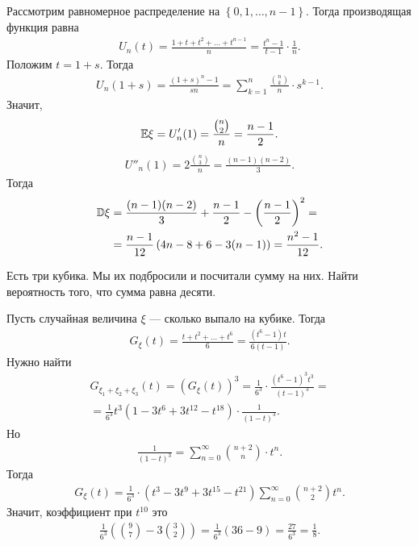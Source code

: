\documentclass[../main.tex]{subfiles}
\begin{document}
\begin{exmpl}
 Рассмотрим равномерное распределение на $  \left\{ 0,1,\ldots,n-1 \right\} $. Тогда производящая функция равна
 \begin{align*}
  U_n(t) = \frac{1 + t + t^{2} + \ldots + t^{n-1}}{n} = \frac{t^{n}-1}{t-1} \cdot \frac{1}{n}.
 \end{align*} Положим $ t = 1 + s $. Тогда
 \begin{align*}
  U_n(1 + s) = \frac{(1+s)^{n} - 1}{sn} = \sum_{k=1}^{n} \frac{\binom n k}{n} \cdot s^{k-1}.
 \end{align*} Значит,
 \begin{align*}
  \mathbb E \xi = U'_n(1) = \frac{\binom n 2}{n} = \frac{n-1}{2}.
 \end{align*}
 \begin{align*}
  U''_n(1) = 2 \frac{\binom n 3}{n} = \frac{(n-1)(n-2)}{3}.
 \end{align*} Тогда
 \begin{align*}
  \mathbb D \xi &= \frac{(n-1)(n-2)}{3} + \frac{n-1}{2} - \left( \frac{n-1}{2} \right)^{2} = \\
  &= \frac{n - 1}{12} \left( 4n - 8 + 6 - 3(n - 1) \right) = \frac{n^{2}-1}{12}.
 \end{align*}
\end{exmpl}

\begin{exmpl}
 Есть три кубика. Мы их подбросили и посчитали сумму на них. Найти вероятность того, что сумма равна десяти.

 Пусть случайная величина $ \xi $ --- сколько выпало на кубике. Тогда
 \begin{align*}
  G_\xi(t) = \frac{t + t^{2} + \ldots + t^{6}}{6} = \frac{(t^{6}-1)t}{6(t-1)}.
 \end{align*} Нужно найти
 \begin{align*}
  G_{\xi_1 + \xi_2 + \xi_3}(t) = (G_\xi(t))^{3} = \frac{1}{6^{3}} \cdot \frac{(t^{6}-1)^{3}t^{3}}{(t-1)^{3}} = \\
  = \frac{1}{6^{3}} t^{3}(1 - 3t^{6} + 3t^{12} - t^{18}) \cdot \frac{1}{(1-t)^{3}}.
 \end{align*} Но
 \begin{align*}
  \frac{1}{(1-t)^{3}} = \sum_{n=0}^{\infty} \binom {n+2} n \cdot t^{n}.
 \end{align*} Тогда
 \begin{align*}
  G_{\xi}(t) =\frac{1}{6^{3}} \cdot (t^{3}-3t^{9}+3t^{15}-t^{21}) \sum_{n=0}^{\infty}\binom {n+2} 2 t^{n}.
 \end{align*} Значит, коэффициент при $ t^{10} $ это
 \begin{align*}
  \frac{1}{6^{3}} \left( \binom 9 7 - 3 \binom 3 2 \right) = \frac{1}{6^{3}} \left( 36 - 9 \right) = \frac{27}{6^{3}} = \frac{1}{8}.
 \end{align*}
\end{exmpl}
\end{document}
